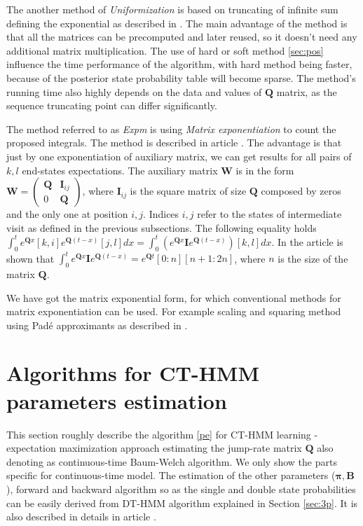 \documentclass[thesis=M,english]{FITthesis}[2012/10/20]
\newcommand{\matr}[1]{\mathbf{#1}}
\begin{document}
The another method of \textit{Uniformization} is based on truncating of infinite sum defining the exponential as described in \cite{Ho11}. The main advantage of the method is that all the matrices can be precomputed and later reused, so it doesn't need any additional matrix multiplication. \cite{Li15} The use of hard or soft method \ref{sec:pos} influence the time performance of the algorithm, with hard method being faster, because of the posterior state probability table will become sparse. The method's running time also highly depends on the data and values of $\matr{Q}$ matrix, as the sequence truncating point can differ significantly.         

The method referred to as \textit{Expm} is using \textit{Matrix exponentiation} to count the proposed integrals. The method is described in article \cite{Va78}. The advantage is that just by one exponentiation of auxiliary matrix, we can get results for all pairs of $k,l$ end-states expectations. The auxiliary matrix $\matr{W}$ is in the form $\matr{W} =  \begin{pmatrix} \matr{Q} & \matr{I}_{ij} \\ 0 & \matr{Q} \end{pmatrix} $, where $\matr{I}_{ij}$ is the square matrix of size $\matr{Q}$ composed by zeros and the only one at position $i,j$. Indices $i,j$ refer to the states of intermediate visit as defined in the previous subsections. The following equality holds $ \int_{0}^{t} {e^{\matr{Q}x}}[k,i] {e^{\matr{Q}(t-x)}}[j,l] dx  =  \int_{0}^{t} ( e^{\matr{Q}x} \matr{I} e^{\matr{Q}(t-x)} )[k,l] dx $. In the article \cite{Va78} is shown that $\int_{0}^{t}  e^{\matr{Q}x} \matr{I} e^{\matr{Q}(t-x)} = {e^{\matr{Q}t}}[0:n][n+1:2n]$, where $n$ is the size of the matrix $\matr{Q}$.

We have got the matrix exponential form, for which conventional methods for matrix exponentiation can be used. For example scaling and squaring method using Pad\'{e} approximants as described in \cite{Hi08}.      


\section{Algorithms for CT-HMM parameters estimation}\label{sec:alg}

This section roughly describe the algorithm \ref{pe} for CT-HMM learning - expectation maximization approach estimating the jump-rate matrix $\matr{Q}$ also denoting as continuous-time Baum-Welch algorithm. We only show the parts specific for continuous-time model. The estimation of the other parameters ($\matr{\pi},\matr{B}$), forward and backward algorithm so as the single and double state probabilities can be easily derived from DT-HMM algorithm explained in Section \ref{sec:3p}. It is also described in details in article \cite{Ra89}.
\end{document}
